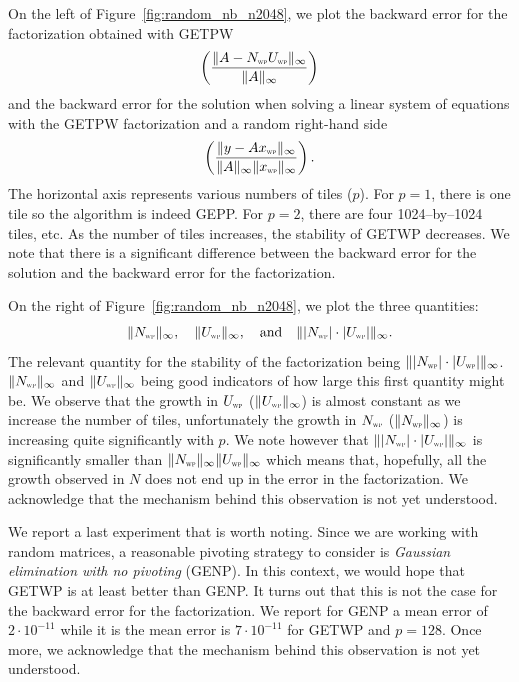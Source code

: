\documentclass{article}
\begin{document}
On the left of Figure~\ref{fig:random_nb_n2048}, we plot the backward error for the factorization obtained with GETPW
$$ \left(\frac{ \| A - N_{\textsc{\tiny wp}}U_{\textsc{\tiny wp}} \|_\infty}{\| A \|_\infty }\right) $$
and
the backward error for the solution when solving a linear system of equations with the GETPW factorization and
a random right-hand side
$$ \left(\frac{ \| y - A x_{\textsc{\tiny wp}} \|_\infty}{\| A \|_\infty \|x_{\textsc{\tiny wp}}\|_\infty }\right). $$
The horizontal axis represents various numbers of tiles ($p$).
For $p=1$, there is one tile so the algorithm is indeed GEPP.
For $p=2$, there are four 1024--by--1024 tiles, etc.
As the number of tiles increases, the stability of GETWP decreases.
We note that there is a significant difference between the backward error for the solution
and the backward error for the factorization.

On the right of Figure~\ref{fig:random_nb_n2048}, we plot the three quantities:
$$
 \| N_{\textsc{\tiny wp}} \|_\infty,\quad
 \| U_{\textsc{\tiny wp}} \|_\infty,\quad \textmd{and}\quad
 \| |N_{\textsc{\tiny wp}} |\cdot| U_{\textsc{\tiny wp}} | \|_\infty.
$$
The relevant quantity for the stability of the factorization being $\| |N_{\textsc{\tiny wp}}
|\cdot| U_{\textsc{\tiny wp}} | \|_\infty$.  $\| N_{\textsc{\tiny wp}} \|_\infty$ and $\| U_{\textsc{\tiny wp}} \|_\infty$
being good indicators of how large this first quantity might be.
We observe that the growth in $U_{\textsc{\tiny wp}}$
($\| U_{\textsc{\tiny wp}} \|_\infty$) is almost constant as we increase the number of tiles, 
unfortunately
the growth in $N_{\textsc{\tiny wp}}$
($\| N_{\textsc{\tiny wp}} \|_\infty$) is increasing quite significantly with $p$.
We note however that 
$\| |N_{\textsc{\tiny wp}} |\cdot| U_{\textsc{\tiny wp}} | \|_\infty$ is significantly smaller than
$\| N_{\textsc{\tiny wp}} \|_\infty \| U_{\textsc{\tiny wp}} \|_\infty$ which means that, hopefully, all the growth observed in $N$ 
does not end up in the error in the factorization.
We acknowledge that the mechanism behind this observation is not yet understood.

We report a last experiment that is worth noting. Since we are working with random
matrices, a reasonable pivoting strategy to consider is
\textit{Gaussian elimination with no pivoting} (GENP).
In this context, we would hope that GETWP is at least better than GENP.
It turns out that this is not the case for the backward error for
the factorization. We report for GENP a mean error of $2\cdot10^{-11}$
while it is the mean error is $7\cdot10^{-11}$ for GETWP and $p=128$.
Once more, we acknowledge that the mechanism behind this observation is not yet
understood.
\end{document}
